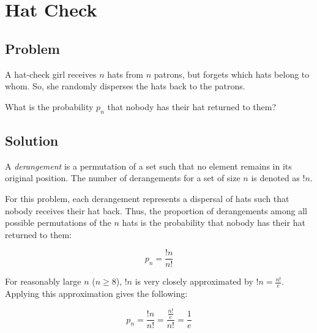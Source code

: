 \documentclass{article}
\date{}
\author{Kaan Aksoy | Feb 13, 2020}
\begin{document}
\maketitle

\section{Hat Check}
\subsection{Problem}

A hat-check girl receives $n$ hats from 
$n$ patrons, but forgets which hats belong  
to whom. So, she randomly disperses the hats 
back to the patrons.

What is the probability $p_n$ that nobody has their 
hat returned to them?

\subsection{Solution}

A \textit{derangement} is a permutation of a set 
such that no element remains in its original position.
The number of derangements for a set of size $n$ is 
denoted as $!n$. 

For this problem, each derangement represents a dispersal 
of hats such that nobody receives their hat back. Thus, 
the proportion of derangements among all possible 
permutations of the $n$ hats is the probability that 
nobody has their hat returned to them:

$$ p_n = \frac{!n}{n!} $$

For reasonably large $n$ ($n \geq 8$), $!n$ is very closely 
approximated by $!n = \frac{n!}{e}$. Applying this 
approximation gives the following:

$$ p_n = \frac{!n}{n!} = \frac{\frac{n!}{e}}{n!} = \frac{1}{e}$$
\end{document}
